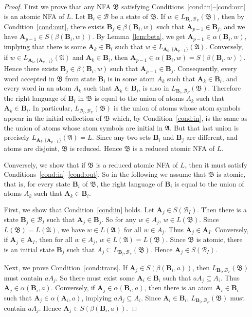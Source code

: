 \documentclass{llncs}
\newcommand{\bA}{{\mathbf A}}
\newcommand{\bmA}{\bm{A}}
\newcommand{\bmB}{\bm{B}}
\newcommand{\cB}{{\mathcal B}}
\newcommand{\fA}{{\mathfrak A}}
\newcommand{\fB}{{\mathfrak B}}
\begin{document}
\begin{proof}
First we prove that any NFA $\fB$ satisfying
Conditions~\ref{cond:in}--\ref{cond:out} is an atomic NFA of $L$.
Let $\bmB_i\in\cB$ be a state of $\fB$. 
If $w\in L_{ \bmB_i, \cB_F} (\fB)$, then by 
Condition~\ref{cond:out}, there exists 
$\bmB_j\in\beta(\bmB_i,w)$ such that $\bA_{p-1}\in \bmB_j$, and 
we have $\bA_{p-1}\in S(\beta(\bmB_i,w))$. 
By Lemma~\ref{lem:beta}, we get $\bA_{p-1}\in \alpha(\bmB_i,w)$, 
implying that there is some $\bA_k\in\bmB_i$ such that 
$w\in L_{\bA_k,\{\bA_{p-1}\}}(\fA)$. 
Conversely, if $w\in L_{\bA_k,\{\bA_{p-1}\}}(\fA)$ and $\bA_k\in\bmB_i$, then 
$\bA_{p-1}\in\alpha(\bmB_i,w)=S(\beta(\bmB_i,w))$. 
Hence there exists $\bmB_j\in\beta(\bmB_i,w)$ such that $\bA_{p-1}\in \bmB_j$. 
Consequently, every word accepted in $\fB$ from state $\bmB_i$ is 
in some atom $A_k$ such that $\bA_k\in \bmB_i$, and 
every word in an atom $A_k$ such that $\bA_k\in \bmB_i$, is also in 
$L_{ \bmB_i, \cB_F} (\fB)$.
Therefore the right language of $\bmB_i$ in $\fB$ is equal to 
the union of atoms $A_k$ such that $\bA_k\in \bmB_i$.
In particular, $L_{\cB_I,\cB_F} (\fB)$ is the union of atoms whose atom symbols
appear in the initial collection of $\fB$ which, by Condition~\ref{cond:in},  
is the same as the union of atoms whose atom symbols are initial in $\fA$.
But that last union is precisely $L_{\bmA_I,\{\bA_{p-1}\}}(\fA)=L$.
Since any two sets $\bmB_i$ and $\bmB_j$ are different, and  
atoms are disjoint, $\fB$ is reduced.
Hence $\fB$ is a reduced atomic NFA of $L$.

Conversely, we show that if $\fB$ is a reduced atomic NFA of $L$, 
then it must satisfy Conditions~\ref{cond:in}--\ref{cond:out}.
So in the following we assume that $\fB$ is atomic, that is, 
for every state $\bmB_i$ of $\fB$, the right language of $\bmB_i$ 
is equal to the union of atoms $A_k$ such that $\bA_k\in \bmB_i$.


First, we show that Condition~\ref{cond:in} holds.
Let $\bA_j\in S(\cB_I)$. Then there is a state $\bmB_j\in\cB_I$ such that 
$\bA_j\in \bmB_j$. So for any $w\in A_j$, $w\in L(\fB)$. 
Since $L(\fB)=L(\fA)$, we have $w\in L(\fA)$ for all $w\in A_j$.
Thus $\bA_j\in \bmA_I$.
Conversely, if $\bA_j\in \bmA_I$, then for all $w\in A_j$, $w\in L(\fA)=L(\fB)$. 
Since $\fB$ is atomic, there is an initial state $\bmB_j$ such that 
$A_j\subseteq L_{\bmB_j,\cB_F}(\fB)$. Hence $\bA_j\in S(\cB_I)$. 

Next, we prove Condition~\ref{cond:trans}. 
If $\bA_j\in S(\beta(\bmB_i,a))$, then $L_{\bmB_i,\cB_F}(\fB)$ must contain $aA_j$. 
So there must exist some $\bA_i\in \bmB_i$ such that $aA_j \subseteq A_i$.
Thus $\bA_j\in \alpha(\bmB_i,a)$.
Conversely, if $\bA_j\in \alpha(\bmB_i,a)$, then there is an atom 
$\bA_i\in \bmB_i$ such that $\bA_j \in \alpha(\bA_i,a)$, implying $aA_j \subseteq A_i$.
Since $\bA_i\in \bmB_i$, $L_{\bmB_i,\cB_F}(\fB)$ must contain $aA_j$.
Hence $\bA_j\in S(\beta(\bmB_i,a))$.


\end{proof}
\end{document}
